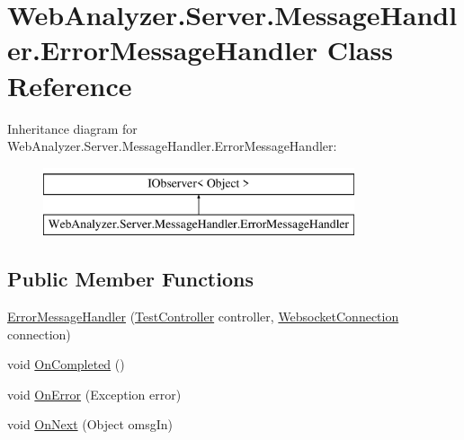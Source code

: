 \hypertarget{class_web_analyzer_1_1_server_1_1_message_handler_1_1_error_message_handler}{}\section{Web\+Analyzer.\+Server.\+Message\+Handler.\+Error\+Message\+Handler Class Reference}
\label{class_web_analyzer_1_1_server_1_1_message_handler_1_1_error_message_handler}
Inheritance diagram for Web\+Analyzer.\+Server.\+Message\+Handler.\+Error\+Message\+Handler\+:\begin{figure}[H]
\begin{center}
\leavevmode
\includegraphics[height=2.000000cm]{class_web_analyzer_1_1_server_1_1_message_handler_1_1_error_message_handler}
\end{center}
\end{figure}
\subsection*{Public Member Functions}
\begin{DoxyCompactItemize}
\item 
\hyperlink{class_web_analyzer_1_1_server_1_1_message_handler_1_1_error_message_handler_a49c29974eceb3140f965c3688924e7c9}{Error\+Message\+Handler} (\hyperlink{class_web_analyzer_1_1_controller_1_1_test_controller}{Test\+Controller} controller, \hyperlink{class_web_analyzer_1_1_server_1_1_websocket_connection}{Websocket\+Connection} connection)
\item 
void \hyperlink{class_web_analyzer_1_1_server_1_1_message_handler_1_1_error_message_handler_a243ac4b4c08be9b91180fd2106917140}{On\+Completed} ()
\item 
void \hyperlink{class_web_analyzer_1_1_server_1_1_message_handler_1_1_error_message_handler_a947628296b419a68d81fad5f22b0e0dc}{On\+Error} (Exception error)
\item 
void \hyperlink{class_web_analyzer_1_1_server_1_1_message_handler_1_1_error_message_handler_aae02faae79d883042e71f70706bdcfce}{On\+Next} (Object omsg\+In)
\end{DoxyCompactItemize}
